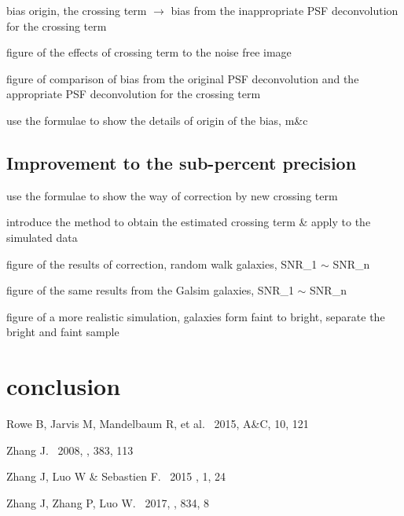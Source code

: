 \documentclass[twocolumn]{aastex62}
\begin{document}
bias origin, the crossing term $\rightarrow$ bias from the inappropriate PSF deconvolution for the crossing term

figure of the effects of crossing term to the noise free image

figure of comparison of bias from the original PSF deconvolution and the appropriate PSF deconvolution for the crossing term

use the formulae to show the details of origin of the bias, m\&c

\subsection{Improvement to the sub-percent precision}\label{sec:improve}
use the formulae to show the way of correction by new crossing term

introduce the method to obtain the estimated crossing term \& apply to the simulated data

figure of the results of correction, random walk galaxies, SNR\_1 $\sim$ SNR\_n

figure of the same results from the Galsim galaxies, SNR\_1 $\sim$ SNR\_n

figure of a more realistic simulation, galaxies form faint to bright, separate the bright and faint sample

\section{conclusion}



\begin{thebibliography}{}

Rowe B, Jarvis M, Mandelbaum R, et al. \ 2015, A\&C, 10, 121

 Zhang J. \ 2008, \mnras, 383, 113


 Zhang J, Luo W \& Sebastien F. \ 2015 \jcap, 1, 24

 Zhang J, Zhang P, Luo W. \ 2017, \apj, 834, 8

\end{thebibliography}
\end{document}
